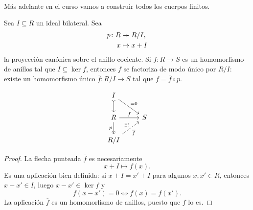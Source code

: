 Más adelante en el curso vamos a construir todos los cuerpos finitos.

\begin{proposicion}
  \label{prop:propiedad-universal-del-anillo-cociente}
  Sea $I\subseteq R$ un ideal bilateral. Sea
  \begin{align*}
    p\colon R & \twoheadrightarrow R/I,\\
    x & \mapsto x + I
  \end{align*}
  la proyección canónica sobre el anillo cociente. Si $f\colon R\to S$ es
  un homomorfismo de anillos tal que $I \subseteq \ker f$, entonces $f$
  se factoriza de modo único por $R/I$: existe un homomorfismo único
  $\overline{f}\colon R/I\to S$ tal que $f = \overline{f}\circ p$.

  \[ \begin{tikzcd}
      I \ar[>->]{d}\ar{dr}{= 0} \\
      R \ar{r}{f}\ar[->>]{d}[swap]{p} & S \\
      R/I\ar[dashed]{ur}{\exists !}[swap]{\overline{f}}
    \end{tikzcd} \]

  \begin{proof}
    La flecha punteada $\overline{f}$ es necesariamente
    $$x + I \mapsto f (x).$$
    Es una aplicación bien definida: si $x + I = x' + I$ para algunos
    $x,x'\in R$, entonces $x - x' \in I$, luego
    $x - x' \in \ker f$ y
    $$f (x - x') = 0 \iff f (x) = f (x').$$
    La aplicación $\overline{f}$ es un homomorfismo de anillos, puesto que
    $f$ lo es.
  \end{proof}
\end{proposicion}

